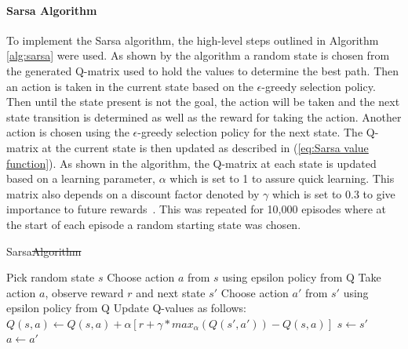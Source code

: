 \documentclass[12pt,american]{report}
\providecommand{\DIFaddtex}[1]{{\protect\color{blue}\uwave{#1}}} %
\providecommand{\DIFdeltex}[1]{{\protect\color{red}\sout{#1}}}                      %
\providecommand{\DIFaddbegin}{} %
\providecommand{\DIFaddend}{} %
\providecommand{\DIFdelbegin}{} %
\providecommand{\DIFdelend}{} %
\providecommand{\DIFadd}[1]{\texorpdfstring{\DIFaddtex{#1}}{#1}} %
\providecommand{\DIFdel}[1]{\texorpdfstring{\DIFdeltex{#1}}{}} %
\newcommand{\DIFscaledelfig}{0.5}
\newlength{\DIFdelgraphicswidth} %
\newlength{\DIFdelgraphicsheight} %
\newcommand{\DIFaddincludegraphics}[2][]{{\color{blue}\fbox{\DIFOincludegraphics[#1]{#2}}}} %
\newcommand{\DIFdelincludegraphics}[2][]{%
\sbox{\DIFdelgraphicsbox}{\DIFOincludegraphics[#1]{#2}}%
\settoboxwidth{\DIFdelgraphicswidth}{\DIFdelgraphicsbox} %
\settoboxtotalheight{\DIFdelgraphicsheight}{\DIFdelgraphicsbox} %
\scalebox{\DIFscaledelfig}{%
\parbox[b]{\DIFdelgraphicswidth}{\usebox{\DIFdelgraphicsbox}\\[-\baselineskip] \rule{\DIFdelgraphicswidth}{0em}}\llap{\resizebox{\DIFdelgraphicswidth}{\DIFdelgraphicsheight}{%
\setlength{\unitlength}{\DIFdelgraphicswidth}%
\begin{picture}(1,1)%
\thicklines\linethickness{2pt} %
{\color[rgb]{1,0,0}\put(0,0){\framebox(1,1){}}}%
{\color[rgb]{1,0,0}\put(0,0){\line( 1,1){1}}}%
{\color[rgb]{1,0,0}\put(0,1){\line(1,-1){1}}}%
\end{picture}%
}\hspace*{3pt}}} %
} %
\DeclareRobustCommand{\DIFaddbegin}{\DIFOaddbegin \let\includegraphics\DIFaddincludegraphics} %
\DeclareRobustCommand{\DIFaddend}{\DIFOaddend \let\includegraphics\DIFOincludegraphics} %
\DeclareRobustCommand{\DIFdelbegin}{\DIFOdelbegin \let\includegraphics\DIFdelincludegraphics} %
\DeclareRobustCommand{\DIFdelend}{\DIFOaddend \let\includegraphics\DIFOincludegraphics} %
\begin{document}
\paragraph{Sarsa Algorithm}
To implement the Sarsa algorithm, the high-level steps outlined in Algorithm \ref{alg:sarsa} were used.  As shown by the algorithm a random state is chosen from the generated Q-matrix used to hold the values to determine the best path.  Then an action is taken in the current state based on the \begin{math}\epsilon\end{math}-greedy selection policy.  Then until the state present is not the goal, the action will be taken and the next state transition is determined as well as the reward for taking the action. Another action is chosen using the \begin{math}\epsilon\end{math}-greedy selection policy for the next state. The Q-matrix at the current state is then updated as described in (\ref{eq:Sarsa value function}). As shown in the algorithm, the Q-matrix at each state is updated based on a learning parameter, \begin{math}\alpha\end{math} which is set to 1 to assure quick learning. This matrix also depends on a discount factor denoted by \begin{math}\gamma\end{math} which is set to 0.3 to give importance to future rewards~\cite{Eden}. This was repeated for 10,000 episodes where at the start of each episode a random starting state was chosen.



\begin{algorithm}
\caption{Sarsa\DIFdelbegin \DIFdel{Algorithm}\DIFdelend ~\cite{Eden}}
\label{alg:sarsa}
\begin{algorithmic} 
\State Pick random state $s$
\State Choose action $a$ from $s$ using epsilon policy from Q
\State Take action $a$, observe reward $r$ and next state $s'$
\State Choose action $a'$ from $s'$ using epsilon policy from Q
\State Update Q-values as follows:
\State \DIFdelbegin \DIFdel{$Q(s,a) \leftarrow Q(s,a) + \alpha [r+ \gamma*max_{\alpha}(Q(s',a')) - Q(s,a)] $
}\DIFdelend \DIFaddbegin \DIFadd{$Q(s,a) \leftarrow Q(s,a) + \alpha [r+ \gamma*(Q(s',a')) - Q(s,a)] $
}\DIFaddend \State $s \leftarrow s'$
\State $a \leftarrow a'$
\EndWhile
\EndFor
\end{algorithmic}
\end{algorithm}
\end{document}
